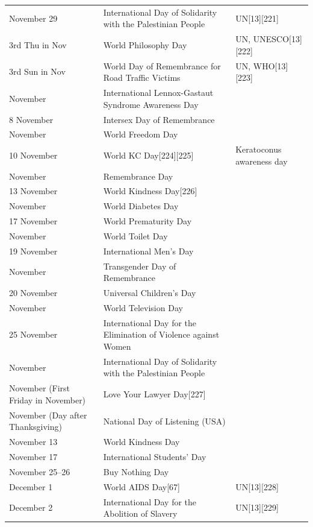 \documentclass[
  openany]{book}
\begin{document}
\begin{longtable}[t]{>{\raggedright\arraybackslash}p{8em}>{\raggedright\arraybackslash}p{20em}>{\raggedright\arraybackslash}p{12em}}
\addlinespace
\rowcolor{gray!6}  November 29 & International Day of Solidarity with the Palestinian People & UN[13][221]\\
3rd Thu in Nov & World Philosophy Day & UN, UNESCO[13][222]\\
\rowcolor{gray!6}  3rd Sun in Nov & World Day of Remembrance for Road Traffic Victims & UN, WHO[13][223]\\
1 November & International Lennox-Gastaut Syndrome Awareness Day & \\
\rowcolor{gray!6}  8 November & Intersex Day of Remembrance & \\
\addlinespace
9 November & World Freedom Day & \\
\rowcolor{gray!6}  10 November & World KC Day[224][225] & Keratoconus awareness day\\
11 November & Remembrance Day & \\
\rowcolor{gray!6}  13 November & World Kindness Day[226] & \\
14 November & World Diabetes Day & \\
\addlinespace
\rowcolor{gray!6}  17 November & World Prematurity Day & \\
19 November & World Toilet Day & \\
\rowcolor{gray!6}  19 November & International Men's Day & \\
20 November & Transgender Day of Remembrance & \\
\rowcolor{gray!6}  20 November & Universal Children's Day & \\
\addlinespace
21 November & World Television Day & \\
\rowcolor{gray!6}  25 November & International Day for the Elimination of Violence against Women & \\
29 November & International Day of Solidarity with the Palestinian People & \\
\rowcolor{gray!6}  November (First Friday in November) & Love Your Lawyer Day[227] & \\
November (Day after Thanksgiving) & National Day of Listening (USA) & \\
\addlinespace
\rowcolor{gray!6}  November 13 & World Kindness Day & \\
November 17 & International Students' Day & \\
\rowcolor{gray!6}  November 25–26 & Buy Nothing Day & \\
December 1 & World AIDS Day[67] & UN[13][228]\\
\rowcolor{gray!6}  December 2 & International Day for the Abolition of Slavery & UN[13][229]\\

\end{longtable}
\end{document}
